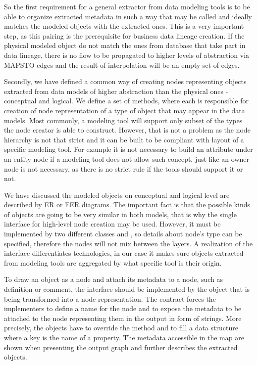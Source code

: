 So the first requirement for a general extractor from data modeling tools is to be able to organize extracted metadata in such a way that  may be called and ideally matches the modeled objects with the extracted ones.
This is a very important step, as this pairing is the prerequisite for business data lineage creation. If the physical modeled object do not match the ones from database that take part in data lineage, there is no flow to be propagated to higher levels of abstraction via MAPS\textunderscore TO edges and the result of interpolation will be an empty set of edges.

Secondly, we have defined a common way of creating nodes representing objects extracted from data models of higher abstraction than the physical ones - conceptual and logical.
We define a set of methods, where each is responsible for creation of node representation of a type of object that may appear in the data models. Most commonly, a modeling tool will support only subset of the types the node creator is able to construct. 
However, that is not a problem as the node hierarchy is not that strict and it can be built to be compliant with layout of a specific modeling tool. 
For example it is not necessary to build an attribute under an entity node if a modeling tool does not allow such concept, just like an owner node is not necessary, as there is no strict rule if the tools should support it or not.

We have discussed the modeled objects on conceptual and logical level are described by ER or EER diagrams. 
The important fact is that the possible kinds of objects are going to be very similar in both models, that is why the single interface  for high-level node creation may be used.
However, it must be implemented by two different classes  and , so details about node's type can be specified, therefore the nodes will not mix between the layers.
A realization of the  interface differentiates technologies, in our case it makes sure objects extracted from modeling tools are aggregated by what specific tool is their origin.

To draw an object as a node and attach its metadata to a node, such as definition or comment, the  interface should be implemented by the object that is being transformed into a node representation.
The contract forces the implementers to define a name for the node and to expose the metadata to be attached to the node representing them in the output in form of strings. 
More precisely, the objects have to override the  method and to fill a  data structure where a key is the name of a property. 
The metadata accessible in the map are shown when presenting the output graph and further describes the extracted objects. \\ 

